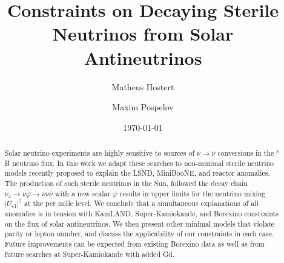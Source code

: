 \documentclass[
reprint,
superscriptaddress,
showpacs,
preprintnumbers,
nofootinbib,
nobibnotes,
amsmath,
amssymb, 
aps,
prd,
floatfix
]{revtex4-1}
\renewcommand{\phi}{\varphi}
\begin{document}

\title{Constraints on Decaying Sterile Neutrinos from Solar Antineutrinos}%


\author{Matheus Hostert}

\author{Maxim Pospelov}

\date{\today}


\begin{abstract}
  Solar neutrino experiments are highly sensitive to sources of $\nu\to\overline{\nu}$ conversions in the $^8$B neutrino flux. In this work we adapt these searches to non-minimal sterile neutrino models recently proposed to explain the LSND, MiniBooNE, and reactor anomalies. The production of such sterile neutrinos in the Sun, followed the decay chain $\nu_4 \to \nu \phi \to \nu \nu \overline{\nu}$ with a new scalar $\phi$ results in upper limits for the neutrino mixing $|U_{e4}|^2$ at the per mille level. We conclude that a simultaneous explanations of all anomalies is in tension with KamLAND, Super-Kamiokande, and Borexino constraints on the flux of solar antineutrinos. We then present other minimal models that violate parity or lepton number, and discuss the applicability of our constraints in each case. Future improvements can be expected from existing Borexino data as well as from future searches at Super-Kamiokande with added Gd.
\end{abstract}

\maketitle


\end{document}
